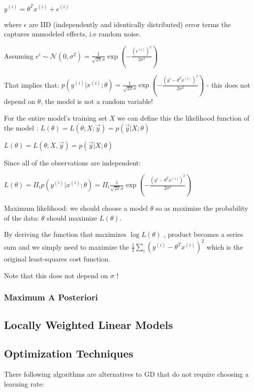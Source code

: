 $y^{(i)}=\theta^Tx^{(i)}+\epsilon^{(i)}$

where $\epsilon$ are IID (independently and identically distributed) error terms the captures unmodeled effects, i.e random noise.

Assuming $e^{i}\sim\mathcal{N}(0,\sigma^2)=\frac{1}{\sqrt{2\pi}\sigma}\exp\left(-\frac{(\epsilon^{(i)})^2}{2\sigma^2}\right)$

That implies that: $p(y^{(i)}|x^{(i)};\theta)=\frac{1}{\sqrt{2\pi}\sigma}\exp\left(-\frac{(y^{i}- \theta^Tx^{(i)})^2}{2\sigma^2}\right)$ - this does not depend on $\theta$, the model is not a random variable! 

For the entire model's training set $X$  we can define this the likelihood function of the model : $L(\theta)=L(\theta;X;\vec{y})=p(\vec{y}|X;\theta)$

$L(\theta) = L(\theta;X,\vec y) = p(\vec y| X;\theta)$

Since all of the observations are independent:

$L(\theta)= \Pi_{i} p(y^{(i)}| x^{(i)};\theta) = \Pi_{i} \frac{1}{\sqrt{2\pi}\sigma}\exp\left(-\frac{(y^{i}- \theta^Tx^{(i)})^2}{2\sigma^2}\right) $

Maximum likelihood: we should choose a model $\theta$ so as maximize the probability of the data: $\theta$ should maximize $L(\theta)$. 

By deriving the function that maximizes $\log L(\theta)$ , product becomes a series sum and we simply need to maximize the $\frac 1 2 \sum_i (y^{(i)}-\theta^T x^{(i)})^2$ which is the original least-squares cost function.

Note that this does not depend on $\sigma$ !

\subsubsection{Maximum A Posteriori}


\subsection{Locally Weighted Linear Models}

\subsection{Optimization Techniques}

There following algorithms are alternatives to GD that do not require choosing a learning rate:

